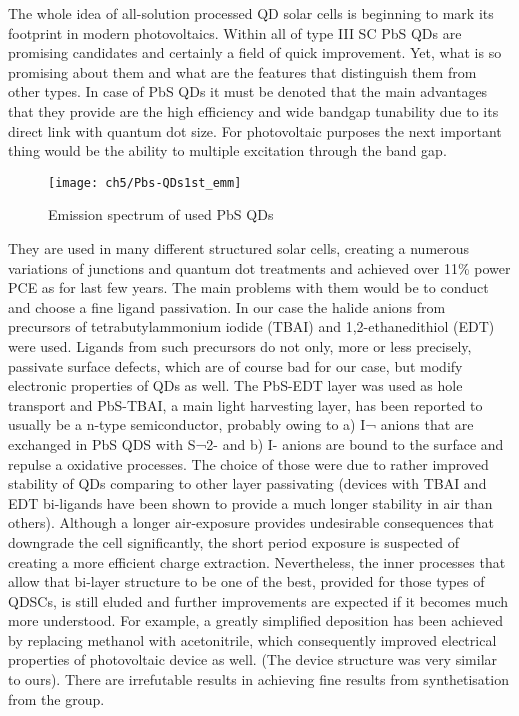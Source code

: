 

The whole idea of all-solution processed QD solar cells is beginning to mark its footprint in modern photovoltaics. Within all of type III SC PbS QDs are promising candidates and certainly a field of quick improvement. Yet, what is so promising about them and what are the features that distinguish them from other types. 
In case of PbS QDs it must be denoted that the main advantages that they provide are the high efficiency and wide bandgap tunability due to its direct link with quantum dot size. For photovoltaic purposes the next important thing would be the ability to multiple excitation through the band gap. 
\begin{wrapfigure}{l}{0.601\textwidth}
\center
\texttt{[image: ch5/Pbs-QDs1st\_emm]}
\caption{Emission spectrum of used PbS QDs \cite{2011}}
\end{wrapfigure}
They are used in many different structured solar cells, creating a numerous variations of junctions and quantum dot treatments and achieved over 11\% power PCE as for last few years. The main problems with them would be to conduct and choose a fine ligand passivation. In our case the halide anions from precursors of tetrabutylammonium iodide (TBAI) and 1,2-ethanedithiol (EDT) were used. Ligands from such precursors do not only, more or less precisely, passivate surface defects, which are of course bad for our case, but modify electronic properties of QDs as well. The PbS-EDT layer was used as hole transport and  PbS-TBAI, a main light harvesting layer,  has been reported to usually be a n-type semiconductor, probably owing to a) I¬  anions that are exchanged in PbS QDS with S¬2- and b) I- anions are bound to the surface and repulse a oxidative processes. The choice of those were due to rather improved stability of QDs comparing to other layer passivating (devices with TBAI and EDT bi-ligands have been shown to provide a much longer stability in air than others). Although a longer air-exposure provides undesirable consequences that downgrade the cell significantly, the short period exposure is suspected of creating a more efficient charge extraction. Nevertheless, the inner processes that allow that bi-layer structure to be one of the best, provided for those types of QDSCs, is still eluded and further improvements are expected if it becomes much more understood. For example, a greatly simplified deposition has been achieved by replacing methanol with acetonitrile, which consequently improved electrical properties of photovoltaic device as well. (The device structure was very similar to ours). There are irrefutable results in achieving fine results from synthetisation from the group.\cite{Wang2017} \cite{Hu2016}
